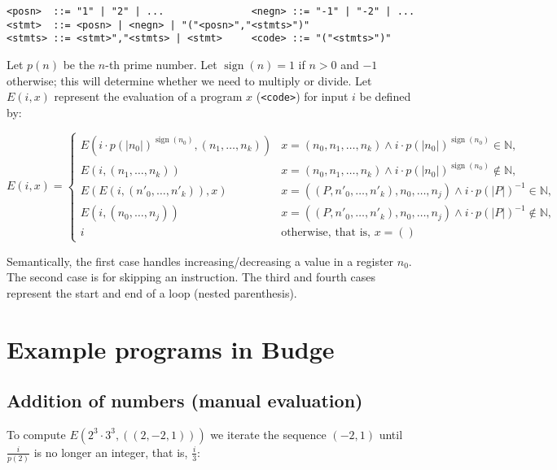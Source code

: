 \documentclass{article}
\DeclareMathOperator{\sign}{sign}
\begin{document}
\begin{verbatim}
<posn>  ::= "1" | "2" | ...               <negn> ::= "-1" | "-2" | ...
<stmt>  ::= <posn> | <negn> | "("<posn>","<stmts>")"
<stmts> ::= <stmt>","<stmts> | <stmt>     <code> ::= "("<stmts>")"
\end{verbatim}

Let $p(n)$ be the $n$-th prime number. Let $\sign(n) = 1$ if $n>0$ and $-1$ otherwise; this will determine whether we need to multiply or divide. Let $E(i, x)$ represent the evaluation of a program $x$ (\texttt{<code>}) for input $i$ be defined by:

$$ E(i, x) = {
\begin{cases}
E(i \cdot p(|n_0|)^{\sign(n_0)}, (n_1, \ldots, n_k)) & x = (n_0, n_1, \ldots, n_k) \land i \cdot p(|n_0|)^{\sign(n_0)} \in \mathbb{N}, \\
E(i, (n_1, \ldots, n_k)) & x = (n_0, n_1, \ldots, n_k) \land i \cdot p(|n_0|)^{\sign(n_0)} \notin \mathbb{N}, \\
E(E(i, (n'_0, \ldots, n'_k)), x) & x = ((P, n'_0, \ldots, n'_k), n_0, \ldots, n_j) \land i \cdot p(|P|)^{-1} \in \mathbb{N}, \\
E(i, (n_0, \ldots, n_j)) & x = ((P, n'_0, \ldots, n'_k), n_0, \ldots, n_j) \land i \cdot p(|P|)^{-1} \notin \mathbb{N}, \\
i & {\text{otherwise, that is, } x = ()}\end{cases}} $$

Semantically, the first case handles increasing/decreasing a value in a register $n_0$. The second case is for skipping an instruction. The third and fourth cases represent the start and end of a loop (nested parenthesis).

\section{Example programs in Budge}

\subsection{Addition of numbers (manual evaluation)}

To compute $E(2^3 \cdot 3^3, ((2, -2, 1)))$ we iterate the sequence $(-2, 1)$ until $\frac{i}{p(2)}$ is no longer an integer, that is, $\frac{i}{3}$:
\end{document}
